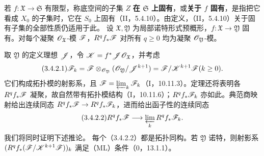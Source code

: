 若 $f:\mathfrak X\to\mathfrak S$ 有限型，称底空间的子集 $Z$ \textbf{在 $\mathfrak S$ 上固有}，或\textbf{关于 $f$ 固有}，是指把它看成 $X_0$ 的子集时，它在 $S_0$ 上固有（II，5.4.10）。由定义，（II，5.4.10）关于固有子集的全部性质仍适用于此。
设 $\mathfrak X,\mathfrak Y$ 为局部诺特形式预概形，$f:\mathfrak X\to\mathfrak Y$ 固有。对每个凝聚 $\mathscr O_{\mathfrak X}$-模 $\mathscr F$，$R^qf_*\mathscr F$ 对所有 $q\ge0$ 均为凝聚 $\mathscr O_{\mathfrak Y}$-模。

取 $\mathfrak Y$ 的定义理想 $\mathscr J$，令 $\mathscr K=f^*\mathscr J\mathscr O_{\mathfrak X}$，并考虑
\begin{equation}\tag{3.4.2.1}
\F_k=\F\otimes_{\OO_{\mathfrak Y}}(\OO_{\mathfrak Y}/\J^{k+1})
=\F/\K^{k+1}\F\qquad(k\ge0).
\end{equation}
它们构成拓扑模的射影系，且 $\mathscr F=\varprojlim_k\mathscr F_k$（I，10.11.3）。定理还将表明各 $R^qf_*\mathscr F$ 凝聚，故自然带有拓扑模结构（I，10.11.6）；$R^qf_*\mathscr F_k$ 亦如此。典范商映射给出连续同态 $R^qf_*\mathscr F\to R^qf_*\mathscr F_k$，进而给出函子性的连续同态
\begin{equation}\tag{3.4.2.2}
R^qf_*\F\longrightarrow\plim_kR^qf_*\F_k.
\end{equation}
我们将同时证明下述推论。
每个（3.4.2.2）都是拓扑同构。若 $\mathfrak Y$ 诺特，则射影系 $(R^qf_*(\mathscr F/\mathscr K^{k+1}\mathscr F))_k$ 满足（ML）条件（0，13.1.1）。

